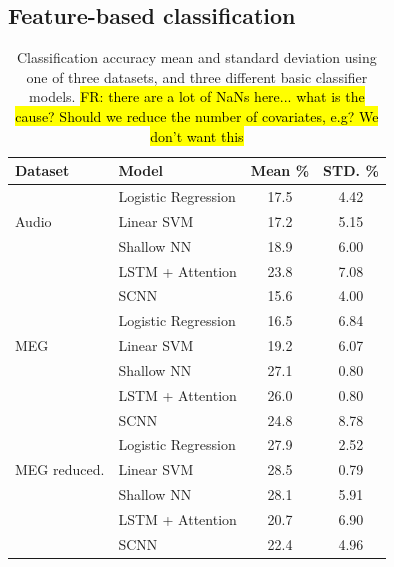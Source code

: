 \documentclass[utf8]{frontiersSCNS} %
\newcommand{\FR}[1]{{\small \textcolor{red}{\hl{FR: #1}}}}
\begin{document}

\subsection{Feature-based classification}

\begin{table}[t]
  \centering
  \label{tab:feat_results}
  \begin{tabular}{l l | c | c}
    \toprule
    \textbf{Dataset} & \textbf{Model} & \textbf{Mean \%} & \textbf{STD. \%} \\
    \toprule
    \multirow{3}{*}{Audio}
                     & Logistic Regression & 17.5 & 4.42  \\
                     & Linear SVM          & 17.2 & 5.15  \\
                     & Shallow NN          & 18.9 & 6.00  \\
                     & LSTM + Attention    & 23.8 & 7.08  \\
                     & SCNN                & 15.6 & 4.00  \\
    \midrule
    \multirow{3}{*}{MEG}
                     & Logistic Regression & 16.5 & 6.84  \\
                     & Linear SVM          & 19.2 & 6.07  \\
                     & Shallow NN          & 27.1 & 0.80  \\
                     & LSTM + Attention    & 26.0 & 0.80  \\
                     & SCNN                & 24.8 & 8.78  \\

    \midrule
    \multirow{3}{*}{MEG reduced.}
                     & Logistic Regression & 27.9 & 2.52  \\
                     & Linear SVM          & 28.5 & 0.79  \\
                     & Shallow NN          & 28.1 & 5.91  \\
                     & LSTM + Attention    & 20.7 & 6.90  \\
                     & SCNN                & 22.4 & 4.96  \\
    \bottomrule
  \end{tabular}
  \caption{Classification accuracy mean and standard deviation using one of three datasets, and three different basic classifier models. \FR{there are a lot of NaNs here... what is the cause? Should we reduce the number of covariates, e.g? We don't want this}}
\end{table}
\end{document}
